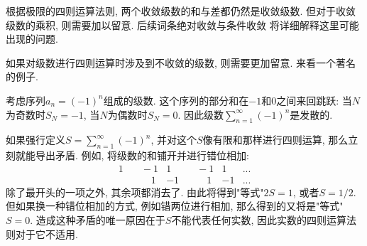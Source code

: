 根据极限的四则运算法则, 两个收敛级数的和与差都仍然是收敛级数. 但对于收敛级数的乘积, 则需要加以留意. 后续词条绝对收敛与条件收敛 将详细解释这里可能出现的问题.

如果对级数进行四则运算时涉及到不收敛的级数, 则需要更加留意. 来看一个著名的例子.

\begin{example}{}
考虑序列$a_n=(-1)^n$组成的级数. 这个序列的部分和在$-1$和$0$之间来回跳跃: 当$N$为奇数时$S_N=-1$, 当$N$为偶数时$S_N=0$. 因此级数$\sum_{n=1}^\infty(-1)^n$是发散的. 

如果强行定义$S=\sum_{n=1}^\infty(-1)^n$, 并对这个$S$像有限和那样进行四则运算, 那么立刻就能导出矛盾. 例如, 将级数的和铺开并进行错位相加:
$$
\begin{aligned}
1 & \quad-1 & 1 & \quad-1 & 1 &...\\
  & \quad\quad1 & -1 & \quad\quad1 & -1 &...
\end{aligned}
$$
除了最开头的一项之外, 其余项都消去了. 由此将得到"等式"$2S=1$, 或者$S=1/2$. 但如果换一种错位相加的方式, 例如错两位进行相加, 那么得到的又将是"等式"$S=0$. 造成这种矛盾的唯一原因在于$S$不能代表任何实数, 因此实数的四则运算法则对于它不适用.
\end{example}